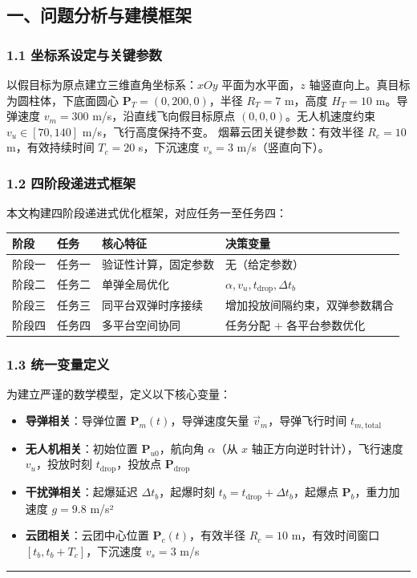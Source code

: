 \documentclass{JXUSTmodeling}
\begin{document}
\subsection{一、问题分析与建模框架}
\subsubsection{1.1 坐标系设定与关键参数}
以假目标为原点建立三维直角坐标系：$xOy$ 平面为水平面，$z$ 轴竖直向上。真目标为圆柱体，下底面圆心 $\mathbf{P}_T = (0, 200, 0)$，半径 $R_T = 7$ m，高度 $H_T = 10$ m。导弹速度 $v_m = 300$ m/s，沿直线飞向假目标原点 $(0,0,0)$。无人机速度约束 $v_u \in [70, 140]$ m/s，飞行高度保持不变。
烟幕云团关键参数：有效半径 $R_c = 10$ m，有效持续时间 $T_c = 20$ s，下沉速度 $v_s = 3$ m/s（竖直向下）。
\subsubsection{1.2 四阶段递进式框架}
本文构建四阶段递进式优化框架，对应任务一至任务四：
\begin{table}[htbp]
  \centering
  \begin{tabularx}{\textwidth}{YYYY}
    \toprule
    阶段 & 任务 & 核心特征 & 决策变量 \\
    \midrule
    阶段一 & 任务一 & 验证性计算，固定参数 & 无（给定参数） \\
    阶段二 & 任务二 & 单弹全局优化 & $\alpha, v_u, t_{\text{drop}}, \Delta t_b$ \\
    阶段三 & 任务三 & 同平台双弹时序接续 & 增加投放间隔约束，双弹参数耦合 \\
    阶段四 & 任务四 & 多平台空间协同 & 任务分配 + 各平台参数优化 \\
    \bottomrule
  \end{tabularx}
\end{table}

\subsubsection{1.3 统一变量定义}
为建立严谨的数学模型，定义以下核心变量：
\begin{itemize}
  \item \textbf{导弹相关}：导弹位置 $\mathbf{P}_m(t)$，导弹速度矢量 $\vec{v}_m$，导弹飞行时间 $t_{m,\text{total}}$
  \item \textbf{无人机相关}：初始位置 $\mathbf{P}_{u0}$，航向角 $\alpha$（从 $x$ 轴正方向逆时针计），飞行速度 $v_u$，投放时刻 $t_{\text{drop}}$，投放点 $\mathbf{P}_{\text{drop}}$
  \item \textbf{干扰弹相关}：起爆延迟 $\Delta t_b$，起爆时刻 $t_b = t_{\text{drop}} + \Delta t_b$，起爆点 $\mathbf{P}_b$，重力加速度 $g = 9.8$ m/s²
  \item \textbf{云团相关}：云团中心位置 $\mathbf{P}_c(t)$，有效半径 $R_c = 10$ m，有效时间窗口 $[t_b, t_b + T_c]$，下沉速度 $v_s = 3$ m/s
\end{itemize}
\noindent\rule{\textwidth}{0.4pt}
\end{document}
